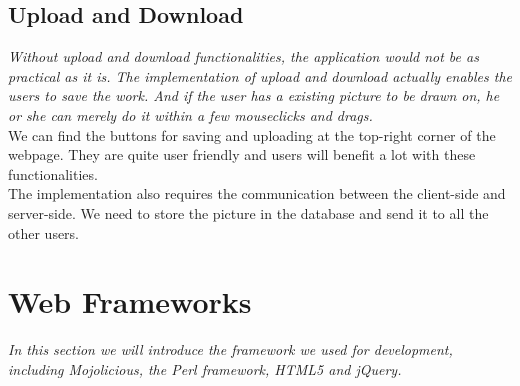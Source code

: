 \documentclass[a4paper,11pt,3p]{article}
\begin{document}
\subsection{Upload and Download}
\emph{Without upload and download functionalities, the application would not be as practical as it is. 
The implementation of upload and download actually enables the users to save the work. And if the user 
has a existing picture to be drawn on, he or she can merely do it within a few mouseclicks and drags.}\\

We can find the buttons for saving and uploading at the top-right corner of the webpage. They are quite 
user friendly and users will benefit a lot with these functionalities.\\

The implementation also requires the communication between the client-side and server-side. We need to 
store the picture in the database and send it to all the other users.\\

\section{Web Frameworks}
\emph{In this section we will introduce the framework we used for development, 
including Mojolicious, the Perl framework, HTML5 and jQuery.}\\
\end{document}
